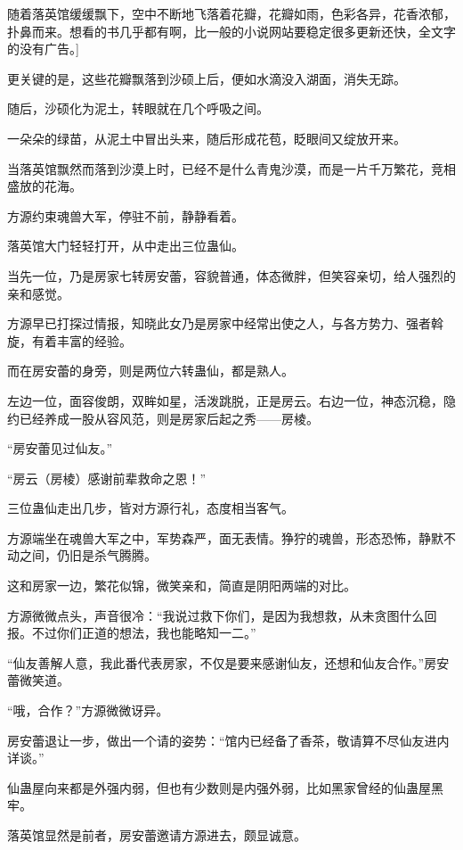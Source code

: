 
\begin{this_body}

随着落英馆缓缓飘下，空中不断地飞落着花瓣，花瓣如雨，色彩各异，花香浓郁，扑鼻而来。想看的书几乎都有啊，比一般的小说网站要稳定很多更新还快，全文字的没有广告。]

更关键的是，这些花瓣飘落到沙硕上后，便如水滴没入湖面，消失无踪。

随后，沙硕化为泥土，转眼就在几个呼吸之间。

一朵朵的绿苗，从泥土中冒出头来，随后形成花苞，眨眼间又绽放开来。

当落英馆飘然而落到沙漠上时，已经不是什么青鬼沙漠，而是一片千万繁花，竞相盛放的花海。

方源约束魂兽大军，停驻不前，静静看着。

落英馆大门轻轻打开，从中走出三位蛊仙。

当先一位，乃是房家七转房安蕾，容貌普通，体态微胖，但笑容亲切，给人强烈的亲和感觉。

方源早已打探过情报，知晓此女乃是房家中经常出使之人，与各方势力、强者斡旋，有着丰富的经验。

而在房安蕾的身旁，则是两位六转蛊仙，都是熟人。

左边一位，面容俊朗，双眸如星，活泼跳脱，正是房云。右边一位，神态沉稳，隐约已经养成一股从容风范，则是房家后起之秀——房棱。

“房安蕾见过仙友。”

“房云（房棱）感谢前辈救命之恩！”

三位蛊仙走出几步，皆对方源行礼，态度相当客气。

方源端坐在魂兽大军之中，军势森严，面无表情。狰狞的魂兽，形态恐怖，静默不动之间，仍旧是杀气腾腾。

这和房家一边，繁花似锦，微笑亲和，简直是阴阳两端的对比。

方源微微点头，声音很冷：“我说过救下你们，是因为我想救，从未贪图什么回报。不过你们正道的想法，我也能略知一二。”

“仙友善解人意，我此番代表房家，不仅是要来感谢仙友，还想和仙友合作。”房安蕾微笑道。

“哦，合作？”方源微微讶异。

房安蕾退让一步，做出一个请的姿势：“馆内已经备了香茶，敬请算不尽仙友进内详谈。”

仙蛊屋向来都是外强内弱，但也有少数则是内强外弱，比如黑家曾经的仙蛊屋黑牢。

落英馆显然是前者，房安蕾邀请方源进去，颇显诚意。


\end{this_body}

